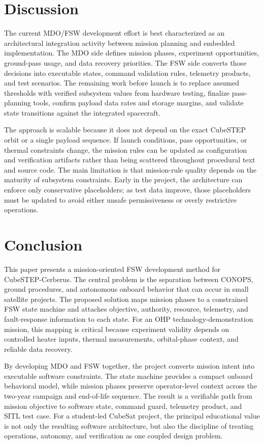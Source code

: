 \documentclass[10pt,letterpaper,twoside,fleqn]{article}
\newcommand{\Indent}{\hspace*{4\fontdimen2\font}}
\begin{document}
\section{Discussion}

 \Indent The current MDO/FSW development effort is best characterized as an architectural integration activity between mission planning and embedded implementation. The MDO side defines mission phases, experiment opportunities, ground-pass usage, and data recovery priorities. The FSW side converts those decisions into executable states, command validation rules, telemetry products, and test scenarios. The remaining work before launch is to replace assumed thresholds with verified subsystem values from hardware testing, finalize pass-planning tools, confirm payload data rates and storage margins, and validate state transitions against the integrated spacecraft. 

 The approach is scalable because it does not depend on the exact CubeSTEP orbit or a single payload sequence. If launch conditions, pass opportunities, or thermal constraints change, the mission rules can be updated as configuration and verification artifacts rather than being scattered throughout procedural text and source code. The main limitation is that mission-rule quality depends on the maturity of subsystem constraints. Early in the project, the architecture can enforce only conservative placeholders; as test data improve, those placeholders must be updated to avoid either unsafe permissiveness or overly restrictive operations. 

\section{Conclusion}

 \Indent This paper presents a mission-oriented FSW development method for CubeSTEP-Cerberus. The central problem is the separation between CONOPS, ground procedures, and autonomous onboard behavior that can occur in small satellite projects. The proposed solution maps mission phases to a constrained FSW state machine and attaches objective, authority, resource, telemetry, and fault-response information to each state. For an OHP technology-demonstration mission, this mapping is critical because experiment validity depends on controlled heater inputs, thermal measurements, orbital-phase context, and reliable data recovery. 

 By developing MDO and FSW together, the project converts mission intent into executable software constraints. The state machine provides a compact onboard behavioral model, while mission phases preserve operator-level context across the two-year campaign and end-of-life sequence. The result is a verifiable path from mission objective to software state, command guard, telemetry product, and SITL test case. For a student-led CubeSat project, the principal educational value is not only the resulting software architecture, but also the discipline of treating operations, autonomy, and verification as one coupled design problem. 
\end{document}
